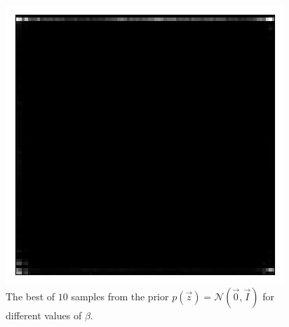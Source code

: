\begin{figure}[h!]
\begin{multicols}{3}
    \includegraphics[scale=0.4]{figures/results/naive_average/beta_4_prior_sample_3.png}
    \caption{$\beta=4$}
\end{multicols}
\caption{The best of $10$ samples from the prior $p(\vec{z}) = \mathcal{N}(\vec{0}, \vec{I})$ for different values of $\beta$.}
\label{fig:naive_average_decoupling_prior_samples}
\end{figure}


